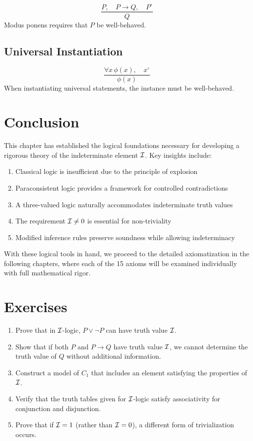 \begin{axiom}
\[
\frac{P, \quad P \rightarrow Q, \quad P^\circ}{Q}
\]
Modus ponens requires that $P$ be well-behaved.
\end{axiom}

\subsection{Universal Instantiation}

\begin{axiom}
\[
\frac{\forall x \, \phi(x), \quad x^\circ}{\phi(x)}
\]
When instantiating universal statements, the instance must be well-behaved.
\end{axiom}

\section{Conclusion}

This chapter has established the logical foundations necessary for developing a rigorous theory of the indeterminate element $\mathcal{I}$. Key insights include:

\begin{enumerate}
    \item Classical logic is insufficient due to the principle of explosion
    \item Paraconsistent logic provides a framework for controlled contradictions
    \item A three-valued logic naturally accommodates indeterminate truth values
    \item The requirement $\mathcal{I} \neq 0$ is essential for non-triviality
    \item Modified inference rules preserve soundness while allowing indeterminacy
\end{enumerate}

With these logical tools in hand, we proceed to the detailed axiomatization in the following chapters, where each of the 15 axioms will be examined individually with full mathematical rigor.

\section{Exercises}

\begin{enumerate}
    \item Prove that in $\mathcal{I}$-logic, $P \lor \neg P$ can have truth value $\mathcal{I}$.
    \item Show that if both $P$ and $P \rightarrow Q$ have truth value $\mathcal{I}$, we cannot determine the truth value of $Q$ without additional information.
    \item Construct a model of $C_1$ that includes an element satisfying the properties of $\mathcal{I}$.
    \item Verify that the truth tables given for $\mathcal{I}$-logic satisfy associativity for conjunction and disjunction.
    \item Prove that if $\mathcal{I} = 1$ (rather than $\mathcal{I} = 0$), a different form of trivialization occurs.
\end{enumerate}
